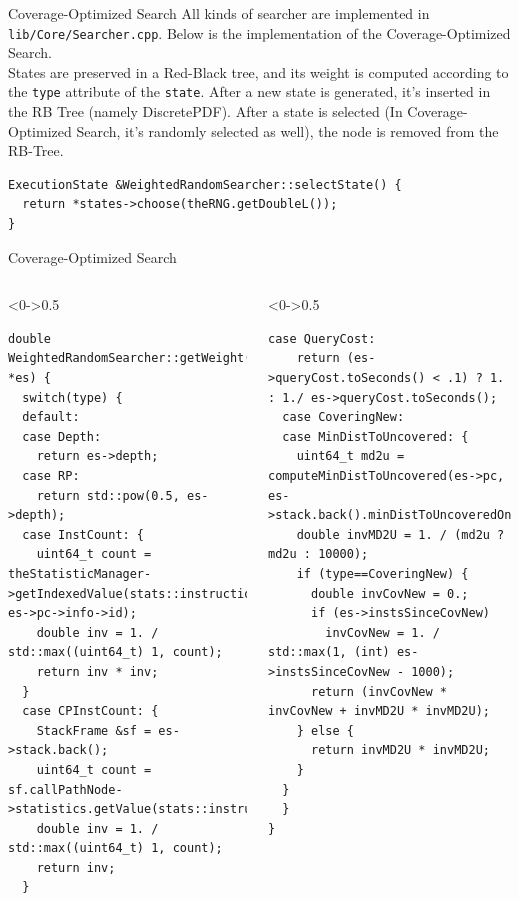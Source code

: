 \documentclass[9pt,aspectratio=43,mathserif,table]{beamer}
\begin{document}
\begin{frame}[fragile]{Coverage-Optimized Search}
	All kinds of searcher are implemented in \verb|lib/Core/Searcher.cpp|. Below is
	the implementation of the Coverage-Optimized Search.\\
	States are preserved in a Red-Black tree, and its weight is computed according to the \verb|type| attribute of
	the  \verb|state|. After a new state is generated, it's inserted in the RB Tree (namely DiscretePDF). After a state
	is selected (In Coverage-Optimized Search, it's randomly selected as well), the node is removed from the RB-Tree.
	\newline

	\begin{lstlisting}[frame=lines]
ExecutionState &WeightedRandomSearcher::selectState() {
  return *states->choose(theRNG.getDoubleL());
}
  \end{lstlisting}
\end{frame}
\begin{frame}[fragile]{Coverage-Optimized Search}
	\begin{columns}[T]
		\begin{column}<0->{0.5\textwidth}
			\begin{lstlisting}[numbersep=4pt]
double WeightedRandomSearcher::getWeight(ExecutionState *es) {
  switch(type) {
  default:
  case Depth:
    return es->depth;
  case RP:
    return std::pow(0.5, es->depth);
  case InstCount: {
    uint64_t count = theStatisticManager->getIndexedValue(stats::instructions, es->pc->info->id);
    double inv = 1. / std::max((uint64_t) 1, count);
    return inv * inv;
  }
  case CPInstCount: {
    StackFrame &sf = es->stack.back();
    uint64_t count = sf.callPathNode->statistics.getValue(stats::instructions);
    double inv = 1. / std::max((uint64_t) 1, count);
    return inv;
  }
        \end{lstlisting}
		\end{column}
		\hfill
		\begin{column}<0->{0.5\textwidth}
			\begin{lstlisting}[firstnumber=last,numbersep=4pt]
    case QueryCost:
    return (es->queryCost.toSeconds() < .1) ? 1. : 1./ es->queryCost.toSeconds();
  case CoveringNew:
  case MinDistToUncovered: {
    uint64_t md2u = computeMinDistToUncovered(es->pc, es->stack.back().minDistToUncoveredOnReturn);
    double invMD2U = 1. / (md2u ? md2u : 10000);
    if (type==CoveringNew) {
      double invCovNew = 0.;
      if (es->instsSinceCovNew)
        invCovNew = 1. / std::max(1, (int) es->instsSinceCovNew - 1000);
      return (invCovNew * invCovNew + invMD2U * invMD2U);
    } else {
      return invMD2U * invMD2U;
    }
  }
  }
}
    \end{lstlisting}
		\end{column}
	\end{columns}
\end{frame}
\end{document}
